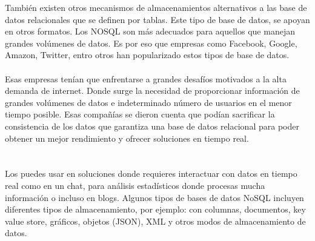 \documentclass[twoside,twocolumn]{article}
\begin{document}
\begin{flushright}
\begin{itemize}
También existen otros mecanismos de almacenamientos alternativos a las base de datos relacionales que se definen por tablas. Este tipo de base de datos, se apoyan en otros formatos. Los NOSQL son más adecuados para aquellos que manejan grandes volúmenes de datos. Es por eso que empresas como Facebook, Google, Amazon, Twitter, entro otros han popularizado estos tipos de base de datos.\textbf{}\\
\textbf{}\\
Esas empresas tenían que enfrentarse a grandes desafíos motivados a la alta demanda de internet. Donde surge la necesidad de proporcionar información de grandes volúmenes de datos e indeterminado número de usuarios en el menor tiempo posible. Esas compañías se dieron cuenta que podían sacrificar la consistencia de los datos que garantiza una base de datos relacional para poder obtener un mejor rendimiento y ofrecer soluciones en tiempo real.\textbf{}\\
\textbf{}\\
\textbf{}\\
Los puedes usar en soluciones donde requieres interactuar con datos en tiempo real como en un chat, para análisis estadísticos donde procesas mucha información o incluso en blogs.
Algunos tipos de bases de datos NoSQL incluyen diferentes tipos de almacenamiento, por ejemplo: con columnas, documentos, key value store, gráficos, objetos (JSON), XML y otros modos de almacenamiento de datos.
\textbf{}\\
\textbf{}\\



\end{itemize}
\end{flushright}
\end{document}
